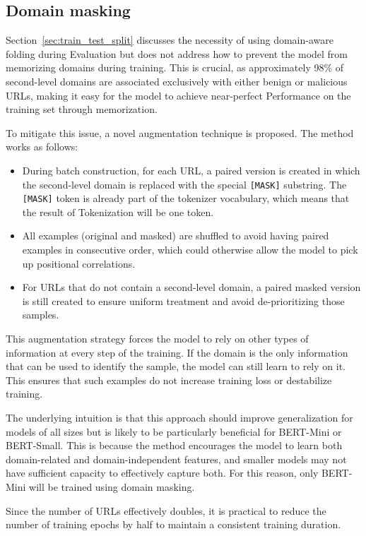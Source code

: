 \subsection{Domain masking}
\label{sec:domain_masking}
Section~\ref{sec:train_test_split} discusses the necessity of using domain-aware folding during Evaluation but does not address how to prevent the model from memorizing domains during training. This is crucial, as approximately 98\% of second-level domains are associated exclusively with either benign or malicious URLs, making it easy for the model to achieve near-perfect Performance on the training set through memorization.

To mitigate this issue, a novel augmentation technique is proposed. The method works as follows:

\begin{itemize}
    \item During batch construction, for each URL, a paired version is created in which the second-level domain is replaced with the special \texttt{[MASK]} substring. The \texttt{[MASK]} token is already part of the tokenizer vocabulary, which means that the result of Tokenization will be one token.
    \item All examples (original and masked) are shuffled to avoid having paired examples in consecutive order, which could otherwise allow the model to pick up positional correlations.
    \item For URLs that do not contain a second-level domain, a paired masked version is still created to ensure uniform treatment and avoid de-prioritizing those samples.
\end{itemize}

This augmentation strategy forces the model to rely on other types of information at every step of the training. If the domain is the only information that can be used to identify the sample, the model can still learn to rely on it. This ensures that such examples do not increase training loss or destabilize training.

The underlying intuition is that this approach should improve generalization for models of all sizes but is likely to be particularly beneficial for BERT-Mini or BERT-Small. This is because the method encourages the model to learn both domain-related and domain-independent features, and smaller models may not have sufficient capacity to effectively capture both. For this reason, only BERT-Mini will be trained using domain masking.

Since the number of URLs effectively doubles, it is practical to reduce the number of training epochs by half to maintain a consistent training duration.
